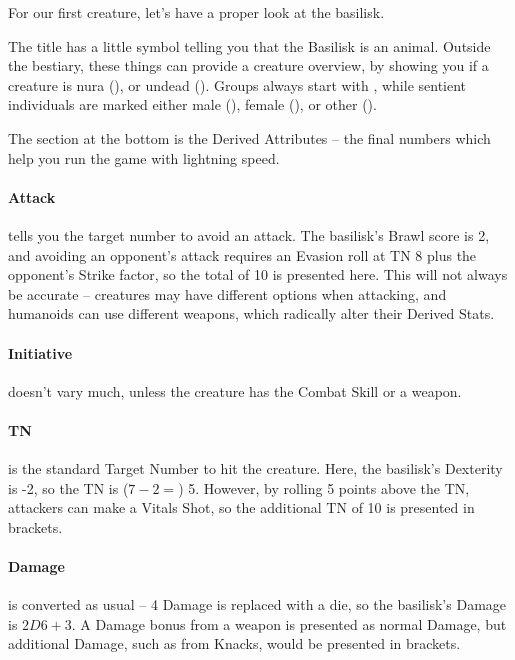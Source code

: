 \begin{multicols}{2}

\noindent
For our first creature, let's have a proper look at the basilisk.

\basilisk

The title has a little symbol telling you that the Basilisk is an animal.
Outside the bestiary, these things can provide a creature overview, by showing you if a creature is  nura (\N), or undead (\D).
Groups always start with \T, while sentient individuals are marked either male (\M), female (\F), or other (\E).

The section at the bottom is the Derived Attributes -- the final numbers which help you run the game with lightning speed.

\paragraph{Attack} tells you the target number to avoid an attack.
The basilisk's Brawl score is 2, and avoiding an opponent's attack requires an Evasion roll at TN 8 plus the opponent's Strike factor, so the total of 10 is presented here.
This will not always be accurate -- creatures may have different options when attacking, and humanoids can use different weapons, which radically alter their Derived Stats.

\paragraph{Initiative} doesn't vary much, unless the creature has the Combat Skill or a weapon.

\paragraph{TN} is the standard Target Number to hit the creature.  Here, the basilisk's Dexterity is -2, so the TN is ($7 - 2 =$) 5.  However, by rolling 5 points above the TN, attackers can make a Vitals Shot, so the additional TN of 10 is presented in brackets.

\paragraph{Damage} is converted as usual -- 4 Damage is replaced with a die, so the basilisk's Damage is $2D6+3$.  A Damage bonus from a weapon is presented as normal Damage, but additional Damage, such as from Knacks, would be presented in brackets.


\end{multicols}
